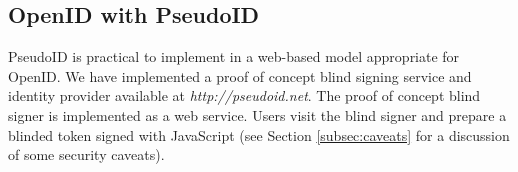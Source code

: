 \documentclass{llncs}
\begin{document}

\subsection{OpenID with PseudoID}

PseudoID is practical to implement in a web-based model appropriate
for OpenID. We have implemented a proof of concept blind signing
service and identity provider available at
\textit{http://pseudoid.net}. The proof of concept blind signer is
implemented as a web service. Users visit the blind signer and 
prepare a blinded token signed with JavaScript (see Section
\ref{subsec:caveats} for a discussion of some security caveats). 
\end{document}
